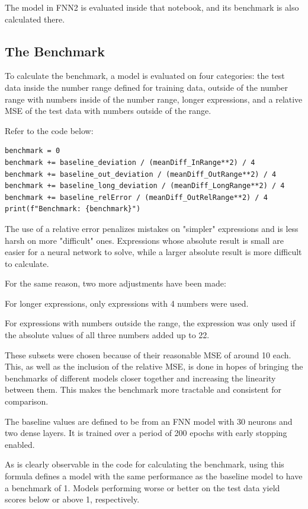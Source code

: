 \documentclass{article}
\begin{document}
The model in FNN2 is evaluated inside that notebook, and its benchmark is also calculated there.

\subsection{The Benchmark}
To calculate the benchmark, a model is evaluated on four categories: the test data inside the number range defined for training data, outside of the number range with numbers inside of the number range, longer expressions, and a relative MSE of the test data with numbers outside of the range.

Refer to the code below:
\begin{Verbatim}
benchmark = 0
benchmark += baseline_deviation / (meanDiff_InRange**2) / 4
benchmark += baseline_out_deviation / (meanDiff_OutRange**2) / 4
benchmark += baseline_long_deviation / (meanDiff_LongRange**2) / 4
benchmark += baseline_relError / (meanDiff_OutRelRange**2) / 4
print(f"Benchmark: {benchmark}")
\end{Verbatim}

The use of a relative error penalizes mistakes on "simpler" expressions and is less harsh on more "difficult" ones. Expressions whose absolute result is small are easier for a neural network to solve, while a larger absolute result is more difficult to calculate.

For the same reason, two more adjustments have been made: 

For longer expressions, only expressions with 4 numbers were used.

For expressions with numbers outside the range, the expression was only used if the absolute values of all three numbers added up to 22.

These subsets were chosen because of their reasonable MSE of around 10 each.
\\[1em]
This, as well as the inclusion of the relative MSE, is done in hopes of bringing the benchmarks of different models closer together and increasing the linearity between them. This makes the benchmark more tractable and consistent for comparison.

The baseline values are defined to be from an FNN model with 30 neurons and two dense layers. It is trained over a period of 200 epochs with early stopping enabled.

As is clearly observable in the code for calculating the benchmark, using this formula defines a model with the same performance as the baseline model to have a benchmark of 1. Models performing worse or better on the test data yield scores below or above 1, respectively.
\end{document}
